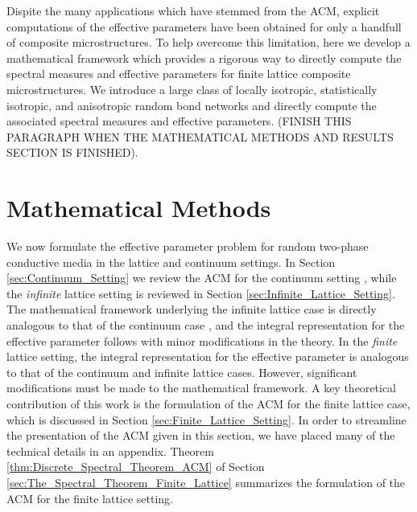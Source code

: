 \documentclass{cmslatex}
\begin{document}
Dispite the many applications which have stemmed from the ACM,
explicit computations of the effective parameters have been obtained
for only a handfull of composite microstructures. To help overcome
this limitation, here we develop a mathematical framework which
provides a rigorous way to directly compute the spectral measures and
effective parameters for finite lattice composite microstructures. We
introduce a large class of locally isotropic, statistically isotropic,
and anisotropic random bond networks and directly compute the
associated spectral measures and effective parameters. (FINISH THIS
PARAGRAPH WHEN THE MATHEMATICAL METHODS AND RESULTS SECTION IS
FINISHED).       

\section{Mathematical Methods}\label{sec:Mathematical_Methods} 
%
We now formulate the effective parameter problem for random
two-phase conductive media in the lattice and continuum
settings. In Section \ref{sec:Continuum_Setting} we review the ACM for  
the continuum setting \cite{Golden:CMP-473}, while the \emph{infinite}
lattice setting \cite{Bruno:JSP-365,Golden:CMP-467} is reviewed in
Section \ref{sec:Infinite_Lattice_Setting}. The mathematical framework
underlying the infinite lattice case is directly analogous to that of
the continuum case \cite{Bruno:JSP-365}, and the integral
representation for the effective parameter follows with minor
modifications in the theory. In the \emph{finite} lattice setting, the
integral representation for the effective parameter is analogous to
that of the continuum and infinite lattice cases. However,
significant modifications must be made to the mathematical
framework. A key theoretical contribution of this work is the
formulation of the ACM for the finite lattice case, which is discussed
in Section \ref{sec:Finite_Lattice_Setting}. In order to streamline
the presentation of the ACM given in this section, we have placed many
of the technical details in an appendix. Theorem
\ref{thm:Discrete_Spectral_Theorem_ACM} of Section
\ref{sec:The_Spectral_Theorem_Finite_Lattice} summarizes the
formulation of the ACM for the finite lattice setting.  
\end{document}
